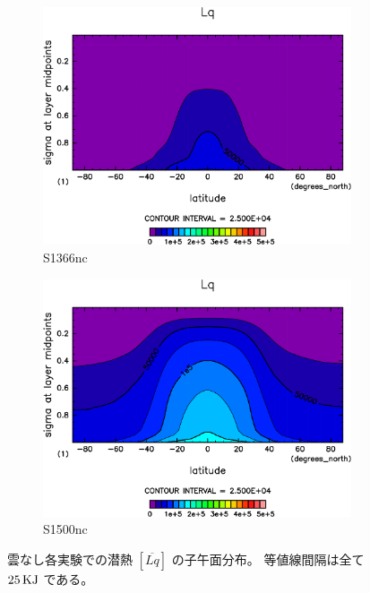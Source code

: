 \documentclass[body]{subfiles}
\begin{document}
\begin{figure}[t]
	\centering
	\begin{subfigure}{.4\textwidth}
		\centering
		\includegraphics[width=\textwidth]{S1366-nc/Lq,time=3650:4015-crop-rotate.pdf}
		\caption{S1366nc}\label{LqS1366nc}
	\end{subfigure}
	\begin{subfigure}{.4\textwidth}
		\centering
		\includegraphics[width=\textwidth]{S1500-nc/Lq,time=3650:4015-crop-rotate.pdf}
		\caption{S1500nc}\label{LqS1500nc}
	\end{subfigure}
	\caption[雲なし各実験での潜熱の子午面分布]{
		雲なし各実験での潜熱 \([\overline{Lq}]\) の子午面分布。
		等値線間隔は全て \(25\hmu{KJ}\) である。
	}\label{Lqnc}
\end{figure}
\end{document}
